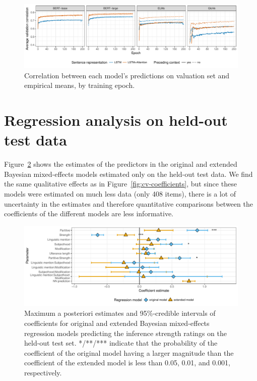\documentclass[11pt,a4paper]{article}
\newcommand{\figref}[1]{Figure~\ref{#1}}
\begin{document}
\begin{figure}[h]
\centering
	\includegraphics[width=\textwidth,trim={0 0.4cm 0 0},clip]{./images/val-corr.pdf}
	\caption{Correlation between each model's predictions on valuation set and empirical means, by training epoch.}
	\label{fig:learning-curves}
\end{figure}


\section{Regression analysis on held-out test data}
\label{app:regression}
\noindent\figref{fig:eval-coefficients} shows the estimates of the predictors in the original and extended Bayesian mixed-effects models estimated only on the held-out test data. We find the same qualitative effects as in \figref{fig:cv-coefficients}, but since these models were estimated on much less data (only 408 items), there is a lot of uncertainty in the estimates and therefore quantitative comparisons between the coefficients of the different models are less informative.

\begin{figure}[h]
\center
\includegraphics[width=\textwidth]{./images/eval-coefficient-estimates.pdf}
\caption{Maximum a posteriori estimates and 95\%-credible intervals of coefficients for original and extended Bayesian mixed-effects regression models predicting the inference strength ratings on the held-out test set. */**/*** indicate that the probability of the coefficient of the original model having a larger magnitude than the coefficient of the extended model is less than 0.05, 0.01, and 0.001, respectively.}
	\label{fig:eval-coefficients}
\end{figure}
\end{document}
